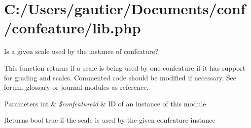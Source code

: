 \hypertarget{_c_1_2_users_2gautier_2_documents_2conf_2confeature_2lib_8php-example}{\section{C\-:/\-Users/gautier/\-Documents/conf/confeature/lib.\-php}
}
Is a given scale used by the instance of confeature?

This function returns if a scale is being used by one confeature if it has support for grading and scales. Commented code should be modified if necessary. See forum, glossary or journal modules as reference.


\begin{DoxyParams}[1]{Parameters}
int & {\em \$confeatureid} & I\-D of an instance of this module \\
\hline
\end{DoxyParams}
\begin{DoxyReturn}{Returns}
bool true if the scale is used by the given confeature instance
\end{DoxyReturn}

\begin{DoxyCodeInclude}
\end{DoxyCodeInclude}
 